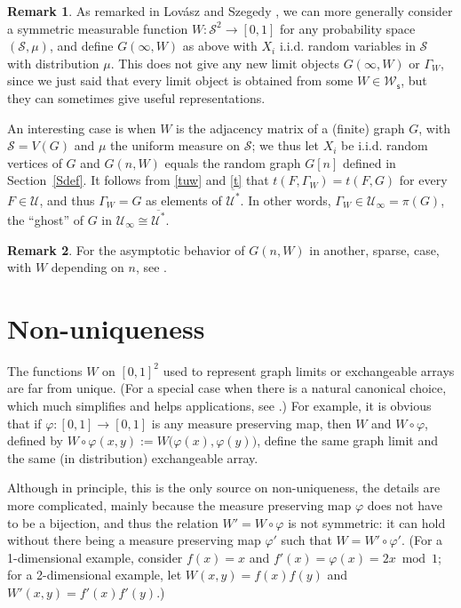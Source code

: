 \documentclass[11pt,reqno,tbtags]{amsart}
\numberwithin{equation}{section}
\theoremstyle{definition}
\newtheorem{remark}{Remark}[section]
\theoremstyle{remark}
\newcommand{\refS}[1]{Section~\ref{#1}}
\newcommand\bigpar[1]{\bigl(#1\bigr)}
\newcommand\iid{i.i.d.\spacefactor=1000}
\newcommand\gf{\varphi}
\newcommand\cS{{\mathcal S}}
\newcommand\cU{{\mathcal U}}
\newcommand\cW{\mathcal W}
\renewcommand{\=}{:=}
\newcommand\oi{[0,1]}
\newcommand{\Lovaszetal}{Lov\'asz and Szegedy}
\newcommand{\cux}{\cU^*}
\newcommand{\cuxq}{\overline{\cux}}
\newcommand{\cuoo}{\cU_\infty}
\newcommand{\exch}{exchangeable}
\newcommand{\cws}{\cW_{\mathsf s}}
\newcommand{\gwx}[1]{G(#1,W)}
\newcommand{\gwoo}{\gwx\infty}
\newcommand{\gwn}{\gwx{n}}
\newcommand{\uw}{\Gamma_W}
\newcommand{\W}[1]{W\circ#1}
\begin{document}
\begin{remark}
As remarked in \Lovaszetal{} \cite{LSz}, we can more generally 
consider a symmetric measurable function $W:\cS^2\to\oi$ for any
probability space $(\cS,\mu)$, and define $\gwoo$ 
as above with $X_i$ \iid{} random variables in $\cS$ with distribution
$\mu$. This does not give any new limit objects $\gwoo$ or $\uw$,
since we just said that every limit object is obtained from some $W\in\cws$,
but they can sometimes give useful representations.

An interesting case is when $W$ is the adjacency matrix of a (finite)
graph $G$, with $\cS=V(G)$ and $\mu$ the uniform measure on $\cS$; we
thus let $X_i$ be \iid{} random vertices of $G$ and $\gwn$ equals the
random graph $G[n]$ defined in \refS{Sdef}. It follows from \eqref{tuw} and
\eqref{t} that $t(F,\uw)=t(F,G)$ for every $F\in\cU$, and thus $\uw=G$
as elements of $\cuxq$. In other words, $\uw\in\cuoo=\pi(G)$, the
``ghost'' of $G$ in $\cuoo\cong\cuxq$.
\end{remark}

\begin{remark}
For the asymptotic behavior of $G(n,W)$ in another, sparse, case,
with $W$ depending on $n$, see \cite{SJ178}.
\end{remark}

\section{Non-uniqueness}\label{Sunique}

The functions $W$ on $\oi^2$ used to represent graph limits or \exch{}
arrays are far from unique.
(For a special case when there is a natural canonical choice, which much
simplifies and helps applications, see \cite{threshold}.)
For example, it is obvious that if $\gf:\oi\to\oi$ is any measure
preserving map, then $W$ and $\W\gf$, defined by
$\W\gf(x,y)\=W\bigpar{\gf(x),\gf(y)}$, define the same graph limit 
and the same (in distribution) \exch{} array.

Although in principle, this is the only source on non-uniqueness, the
details are more complicated, mainly because the measure preserving
map $\gf$ does not have to be a bijection, and thus the relation $W'=\W\gf$
is not symmetric: it can hold without there being a measure preserving
map $\gf'$ such that $W=W'\circ \gf'$. (For a 1-dimensional example,
consider $f(x)=x$ and  $f'(x)=\gf(x)=2x \bmod1$; for a 2-dimensional
example, let $W(x,y)=f(x)f(y)$ and $W'(x,y)=f'(x)f'(y)$.)
\end{document}
